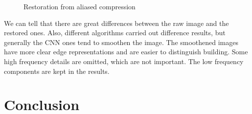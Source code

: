 \documentclass[10pt,twocolumn,letterpaper]{article}
\begin{document}
\begin{figure}[H]
    \caption{Restoration from aliased compression}
\end{figure}
We can tell that there are great differences between the raw image and the restored ones.
Also, different algorithms carried out difference results, but generally the CNN ones tend to smoothen the image.
The smoothened images have more clear edge representations and are easier to distinguish building.
Some high frequency details are omitted, which are not important. The low frequency components are kept in the results.

\section{Conclusion}

{\small


}
\end{document}
